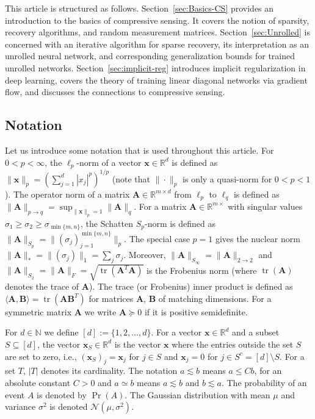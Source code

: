 \documentclass{svproc}
\newcommand{\corr}[1]{#1}
\newcommand{\bA}{\boldsymbol{A}}
\newcommand{\bB}{\boldsymbol{B}}
\newcommand{\bx}{\boldsymbol{x}}
\newcommand{\0}{\boldsymbol{0}}
\newcommand{\1}{\boldsymbol{1}}
\newcommand{\calN}{\mathcal{N}}
\renewcommand{\subset}{\subseteq}
\def\N{\mathbb{N}}
\def\calN{\mathcal{N}}
\def\R{\mathbb{R}}
\begin{document}
\medskip

This article is structured as follows. Section~\ref{sec:Basics-CS} provides an introduction to the basics of compressive sensing. It covers the notion of sparsity, recovery algorithms\corr{,} and random measurement matrices. Section~\ref{sec:Unrolled} is concerned with an iterative algorithm for sparse recovery, its interpretation as \corr{an} unrolled neural network\corr{,} and corresponding generalization bounds for trained unrolled networks. Section~\ref{sec:implicit-reg} introduces \corr{implicit regularization} in deep learning, covers \corr{the} theory \corr{of} training linear diagonal networks via gradient flow\corr{,} and \corr{discusses} the connections to compressive sensing.





\subsection{Notation}
\label{sec:notation}

Let us introduce some notation that is used throughout this article. For $0<p<\infty$, the $\ell_p$-norm of a vector $\bx \in \R^d$ is defined as $\|\bx\|_p = (\sum_{j=1}^d |x_j|^p)^{1/p}$ (note that $\|\cdot\|_p$ is only a quasi-norm for $0<p<1$). The operator norm of a matrix $\bA\in\mathbb{R}^{m\times d}$ from $\ell_p$ to $\ell_q$ is defined as $\|\bA\|_{p \to q} = \sup_{\|\bx\|_p = 1} \|\bA\|_q$. For a matrix $\bA \in \R^{m \times}$ with singular values $\sigma_{1} \geq \sigma_{2} \geq \sigma_{\min\{m,n\}}$, the Schatten $S_p$-norm is defined as $\|\bA\|_{S_p} = \|(\sigma_j)_{j=1}^{\min\{m,n\}}\|_p$. The special case $p=1$ gives the nuclear norm $\|\bA\|_* = \|(\sigma_j)\|_1 = \sum_{j} \sigma_j$. Moreover, $\|\bA\|_{S_\infty} = \|\bA\|_{2 \to 2}$ and $\|\bA\|_{S_2} = \|\bA\|_F = \sqrt{\operatorname{tr}(\bA^T\bA)}$ is the Frobenius norm (where $\operatorname{tr}(\bA)$ denotes the trace of $\bA$). The trace (or Frobenius) inner product is defined as $\langle \bA,\bB\rangle = \operatorname{tr}(\bA \bB^T)$ for matrices $\bA$, $\bB$ of matching dimensions.
For a symmetric matrix $\bA$ we write $\bA \succeq 0$ if it is positive semidefinite.
 
For $d \in \N$ we define $[d]:=\{1,2,\hdots, d\}$. For a vector $\bx \in \R^d$ and a subset $S \subset [d]$, the vector $\bx_S \in \R^d$ is the vector $\bx$ where the entries outside the set $S$ are set to zero, i.e.,
$(\bx_S)_j = \bx_j$ for $j \in S$ and $\bx_j = 0$ for $j \in S^c = [d] \setminus S$. For a set $T$, $|T|$ denotes its cardinality. The notation $a \lesssim b$ means $a \le Cb$, for an absolute constant $C > 0$ and $a \simeq b$ means $a \lesssim b$ and $b \lesssim a$. 
The probability of an event $A$ is denoted by $\Pr(A)$. The Gaussian distribution with mean $\mu$ and variance $\sigma^2$ is denoted $\calN(\mu,\sigma^2)$.
\end{document}
